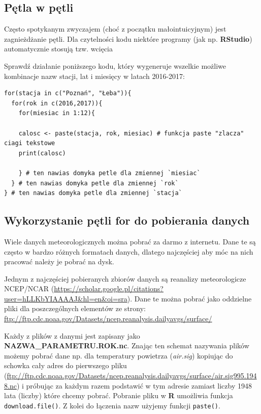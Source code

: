 \documentclass[]{book}
\theoremstyle{definition}
\theoremstyle{definition}
\theoremstyle{definition}
\theoremstyle{remark}
\begin{document}
\subsection{Pętla w pętli}\label{petla-w-petli}

Często spotykanym zwyczajem (choć z początku małointuicyjnym) jest
zagnieżdżanie pętli. Dla czytelności kodu niektóre programy (jak np.
\textbf{RStudio}) automatycznie stosują tzw. wcięcia

Sprawdź działanie poniższego kodu, który wygeneruje wszelkie możliwe
kombinacje nazw stacji, lat i miesięcy w latach 2016-2017:

\begin{verbatim}
for(stacja in c("Poznań", "Łeba")){
  for(rok in c(2016,2017)){
    for(miesiac in 1:12){
    
    calosc <- paste(stacja, rok, miesiac) # funkcja paste "zlacza" ciagi tekstowe 
    print(calosc)
    
    } # ten nawias domyka petle dla zmiennej `miesiac`
  } # ten nawias domyka petle dla zmiennej `rok`
} # ten nawias domyka petle dla zmiennej `stacja`
\end{verbatim}

\subsection{Wykorzystanie pętli for do pobierania
danych}\label{wykorzystanie-petli-for-do-pobierania-danych}

Wiele danych meteorologicznych można pobrać za darmo z internetu. Dane
te są często w bardzo różnych formatach danych, dlatego najczęściej aby
móc na nich pracować należy je pobrać na dysk.

Jednym z najczęściej pobieranych zbiorów danych są reanalizy
meteorologicze NCEP/NCAR \citep{kalnay1996}
(\url{https://scholar.google.pl/citations?user=hLLKbYIAAAAJ\&hl=en\&oi=sra}).
Dane te można pobrać jako oddzielne pliki dla poszczególnych elementów
ze strony:
\url{ftp://ftp.cdc.noaa.gov/Datasets/ncep.reanalysis.dailyavgs/surface/}

Każdy z plików z danymi jest zapisany jako
\textbf{NAZWA\_PARAMETRU.ROK.nc}. Znając ten schemat nazywania plików
możemy pobrać dane np. dla temperatury powietrza (\emph{air.sig})
kopiując do schowka cały adres do pierwszego pliku
(\url{ftp://ftp.cdc.noaa.gov/Datasets/ncep.reanalysis.dailyavgs/surface/air.sig995.1948.nc})
i próbując za każdym razem podstawić w tym adresie zamiast liczby 1948
lata (liczby) które chcemy pobrać. Pobranie pliku w \textbf{R} umożliwia
funkcja \texttt{download.file()}. Z kolei do łączenia nazw użyjemy
funkcji \texttt{paste()}.
\end{document}
